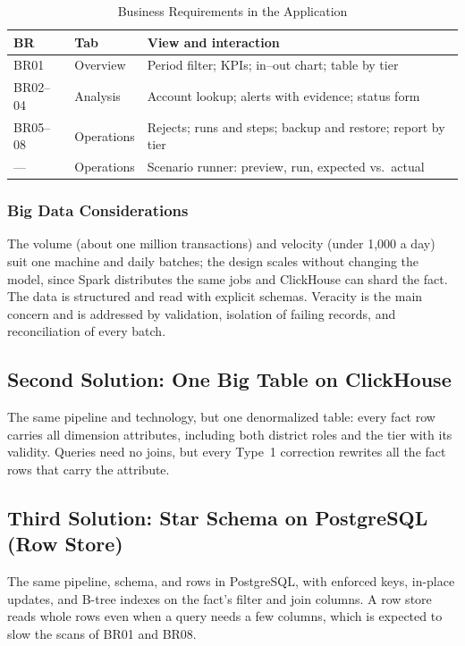 \documentclass[peerreview]{IEEEtran}
\begin{document}
\begin{table}[!t]
\centering
\caption{Business Requirements in the Application}
\label{tab:appmap}
\footnotesize
\setlength{\tabcolsep}{4pt}
\begin{tabular}{l L{1.6cm} L{5.0cm}}
\toprule
\textbf{BR} & \textbf{Tab} & \textbf{View and interaction} \\
\midrule
BR01 & Overview & Period filter; KPIs; in--out chart; table by tier \\
BR02--04 & Analysis & Account lookup; alerts with evidence; status form \\
BR05--08 & Operations & Rejects; runs and steps; backup and restore; report by tier \\
--- & Operations & Scenario runner: preview, run, expected vs.\ actual \\
\bottomrule
\end{tabular}
\end{table}

\subsubsection{Big Data Considerations}
The volume (about one million transactions) and velocity (under 1,000 a day) suit one
machine and daily batches; the design scales without changing the model, since Spark
distributes the same jobs and ClickHouse can shard the fact. The data is structured and read
with explicit schemas. Veracity is the main concern and is addressed by validation,
isolation of failing records, and reconciliation of every batch.

\subsection{Second Solution: One Big Table on ClickHouse}
\label{sec:sol-obt}
The same pipeline and technology, but one denormalized table: every fact row carries all
dimension attributes, including both district roles and the tier with its validity. Queries
need no joins, but every Type~1 correction rewrites all the fact rows that carry the
attribute.

\subsection{Third Solution: Star Schema on PostgreSQL (Row Store)}
\label{sec:sol-postgres}
The same pipeline, schema, and rows in PostgreSQL, with enforced keys, in-place updates, and
B-tree indexes on the fact's filter and join columns. A row store reads whole rows even when
a query needs a few columns, which is expected to slow the scans of BR01 and BR08.
\end{document}
